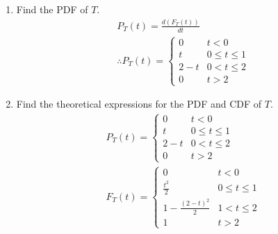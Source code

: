 \documentclass[journal,12pt,twocolumn]{IEEEtran}
\renewcommand\thesection{\arabic{section}}
\begin{document}
\begin{enumerate}[label=\thesection.\arabic*
,ref=\thesection.\theenumi]
\begin{lstlisting}
\end{lstlisting}
Run the following command in the terminal to run the code
\begin{lstlisting}
python3 T_plot.py
\end{lstlisting}
From Fig \eqref{fig:T_plot}
\begin{align}
&P(U_1+U_2<t, 0\leq t \leq 1)=\frac{ \Delta(EOF)}{\Delta(AEOD)}\\
&=\frac{t^2}{2}\\
&P(U_1+U_2<t, 1\leq t \leq 2)=\frac{\Delta(ABC)}{\Delta(AEOD)}\\
&=1-\frac{(2-t)^{2}}{2}\\
&\therefore F_{T}(t)=P(U_1 +U_2<t)=
\begin{cases}
0 & t<0\\
\frac{t^2}{2} & 0\leq t \leq 1\\
1-\frac{(2-t)^{2}}{2} & 1< t \leq 2\\
1 & t>2
\end{cases}
\end{align}
\item Find the PDF of $T$.\\
\solution 
\begin{align}
P_{T}(t)=\frac{d(F_{T}(t))}{dt}\\
\therefore P_{T}(t)=
\begin{cases}
0 & t<0\\
t & 0\leq t \leq 1\\
2-t  & 0< t \leq 2\\
0 & t>2 
\end{cases}    
\end{align}
\item Find the theoretical expressions for the PDF and CDF of $T$.
\\
\solution
\begin{align}
P_{T}(t)=
\begin{cases}
0 & t<0\\
t & 0\leq t \leq 1\\
2-t  & 0< t \leq 2\\
0 & t>2 
\end{cases} 
\\   
F_{T}(t)=
\begin{cases}
0 & t<0\\
\frac{t^2}{2} & 0\leq t \leq 1\\
1-\frac{(2-t)^{2}}{2} & 1< t \leq 2\\
1 & t>2
\end{cases}
\end{align}

\end{enumerate}
\end{document}
